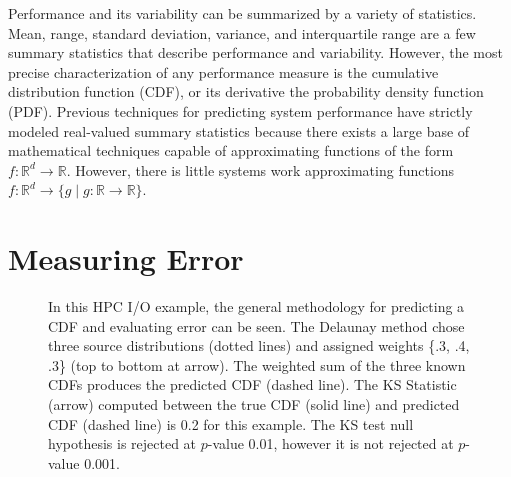 
Performance and its variability can be summarized by a variety of statistics. Mean, range, standard deviation, variance, and interquartile range are a few summary statistics that describe performance and variability. However, the most precise characterization of any performance measure is the cumulative distribution function (CDF), or its derivative the probability density function (PDF). Previous techniques for predicting system performance have strictly modeled real-valued summary statistics because there exists a large base of mathematical techniques capable of approximating functions of the form $f: \mathbb{R}^d \rightarrow \mathbb{R}$. However, there is little systems work approximating functions $f: \mathbb{R}^d \rightarrow \{g \mid g: \mathbb{R} \rightarrow \mathbb{R}\}$.

\section{Measuring Error}
\label{sec:error}

\begin{figure}[htb]
  \centering
  \vspace{-0.3cm}
  \caption{In this HPC I/O example, the general methodology for
    predicting a CDF and evaluating error can be seen. The Delaunay
    method chose three source distributions (dotted lines) and
    assigned weights \{.3, .4, .3\} (top to bottom at arrow). The
    weighted sum of the three known CDFs produces the predicted CDF
    (dashed line). The KS Statistic (arrow) computed between the true
    CDF (solid line) and predicted CDF (dashed line) is 0.2 for this
    example. The KS test null hypothesis is rejected at $p$-value
    0.01, however it is not rejected at $p$-value 0.001.}
  \label{fig:prediction-example}
\end{figure}

